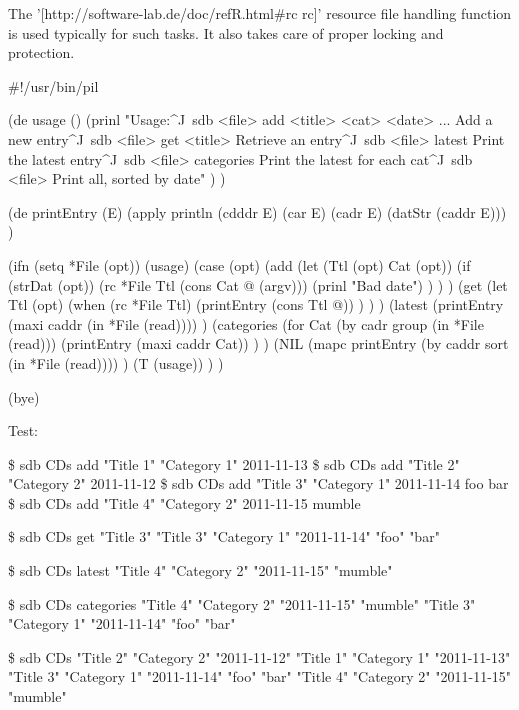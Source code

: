 \begin{wideverbatim}

The '[http://software-lab.de/doc/refR.html#rc rc]' resource file handling
function is used typically for such tasks. It also takes care of proper locking
and protection.

#!/usr/bin/pil

(de usage ()
   (prinl
      "Usage:^J\
      sdb <file> add <title> <cat> <date> ...  Add a new entry^J\
      sdb <file> get <title>                   Retrieve an entry^J\
      sdb <file> latest                        Print the latest entry^J\
      sdb <file> categories                    Print the latest for each cat^J\
      sdb <file>                               Print all, sorted by date" ) )

(de printEntry (E)
   (apply println (cdddr E) (car E) (cadr E) (datStr (caddr E))) )

(ifn (setq *File (opt))
   (usage)
   (case (opt)
      (add
         (let (Ttl (opt)  Cat (opt))
            (if (strDat (opt))
               (rc *File Ttl (cons Cat @ (argv)))
               (prinl "Bad date") ) ) )
      (get
         (let Ttl (opt)
            (when (rc *File Ttl)
               (printEntry (cons Ttl @)) ) ) )
      (latest
         (printEntry (maxi caddr (in *File (read)))) )
      (categories
         (for Cat (by cadr group (in *File (read)))
            (printEntry (maxi caddr Cat)) ) )
      (NIL
         (mapc printEntry (by caddr sort (in *File (read)))) )
      (T (usage)) ) )

(bye)

\end{wideverbatim}

\begin{wideverbatim}


Test:

\$ sdb CDs add "Title 1" "Category 1" 2011-11-13
\$ sdb CDs add "Title 2" "Category 2" 2011-11-12
\$ sdb CDs add "Title 3" "Category 1" 2011-11-14 foo bar
\$ sdb CDs add "Title 4" "Category 2" 2011-11-15 mumble

\$ sdb CDs get "Title 3"
"Title 3" "Category 1" "2011-11-14" "foo" "bar"

\$ sdb CDs latest
"Title 4" "Category 2" "2011-11-15" "mumble"

\$ sdb CDs categories
"Title 4" "Category 2" "2011-11-15" "mumble"
"Title 3" "Category 1" "2011-11-14" "foo" "bar"

\$ sdb CDs
"Title 2" "Category 2" "2011-11-12"
"Title 1" "Category 1" "2011-11-13"
"Title 3" "Category 1" "2011-11-14" "foo" "bar"
"Title 4" "Category 2" "2011-11-15" "mumble"

\end{wideverbatim}

